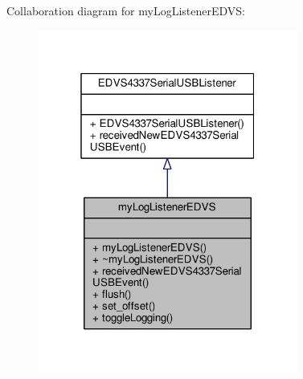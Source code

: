 Collaboration diagram for my\+Log\+Listener\+E\+D\+V\+S\+:
\nopagebreak
\begin{figure}[H]
\begin{center}
\leavevmode
\includegraphics[width=241pt]{classmy_log_listener_e_d_v_s__coll__graph}
\end{center}
\end{figure}
